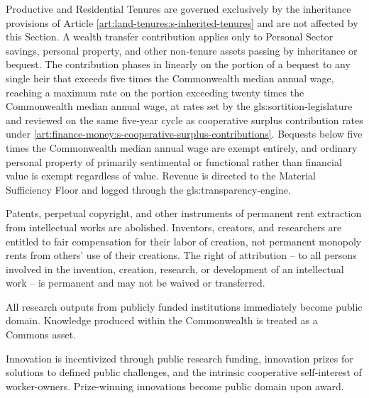 Productive and Residential Tenures are governed exclusively by the inheritance provisions of Article \ref{art:land-tenures:s-inherited-tenures} and are not affected by this Section. A wealth transfer contribution applies only to Personal Sector savings, personal property, and other non-tenure assets passing by inheritance or bequest. The contribution phases in linearly on the portion of a bequest to any single heir that exceeds five times the Commonwealth median annual wage, reaching a maximum rate on the portion exceeding twenty times the Commonwealth median annual wage, at rates set by the \gls{gls:sortition-legislature} and reviewed on the same five-year cycle as cooperative surplus contribution rates under \ref{art:finance-money:s-cooperative-surplus-contributions}. Bequests below five times the Commonwealth median annual wage are exempt entirely, and ordinary personal property of primarily sentimental or functional rather than financial value is exempt regardless of value. Revenue is directed to the Material Sufficiency Floor and logged through the \gls{gls:transparency-engine}.


Patents, perpetual copyright, and other instruments of permanent rent extraction from intellectual works are abolished. Inventors, creators, and researchers are entitled to fair compensation for their labor of creation, not permanent monopoly rents from others' use of their creations. The right of attribution -- to all persons involved in the invention, creation, research, or development of an intellectual work -- is permanent and may not be waived or transferred.

All research outputs from publicly funded institutions immediately become public domain. Knowledge produced within the Commonwealth is treated as a Commons asset.

Innovation is incentivized through public research funding, innovation prizes for solutions to defined public challenges, and the intrinsic cooperative self-interest of worker-owners. Prize-winning innovations become public domain upon award.

